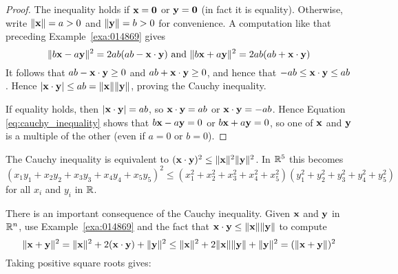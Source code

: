 
\begin{proof}
The inequality holds if $\textbf{x} = \textbf{0}$ or $\textbf{y} = \textbf{0}$ (in fact it is equality). Otherwise, write $\|\textbf{x}\| = a > 0$ and $\|\textbf{y}\| = b > 0$ for convenience. A computation like that preceding Example~\ref{exa:014869} gives
\begin{equation}
\label{eq:cauchy_inequality}
\| b\textbf{x} - a\textbf{y} \|^2 = 2ab(ab - \textbf{x} \cdot \textbf{y}) \mbox{ and } \| b\textbf{x} + a\textbf{y} \|^2 = 2ab(ab + \textbf{x} \cdot \textbf{y})
\end{equation}
It follows that $ab - \textbf{x} \cdot \textbf{y} \geq 0$ and $ab + \textbf{x} \cdot \textbf{y} \geq 0$, and hence that $-ab \leq \textbf{x} \cdot \textbf{y} \leq ab$. Hence $|\textbf{x} \cdot \textbf{y}| \leq ab = \|\textbf{x}\|\|\textbf{y}\|$, proving the Cauchy inequality.

If equality holds, then $|\textbf{x} \cdot \textbf{y}| = ab$, so $\textbf{x} \cdot \textbf{y} = ab$ or $\textbf{x} \cdot \textbf{y} = -ab$. Hence Equation \ref{eq:cauchy_inequality} shows that $b\textbf{x} - a\textbf{y} = 0$ or $b\textbf{x} + a\textbf{y} = 0$, so one of $\textbf{x}$ and $\textbf{y}$ is a multiple of the other (even if $a = 0$ or $b = 0$).
\end{proof}

The Cauchy inequality is equivalent to $(\textbf{x} \cdot \textbf{y})^{2} \leq \|\textbf{x}\|^{2}\|\textbf{y}\|^{2}$. In $\mathbb{R}^5$ this becomes
\begin{equation*}
(x_1y_1 + x_2y_2 + x_3y_3 + x_4y_4 + x_5y_5)^2
\leq (x_1^2 + x_2^2 + x_3^2 + x_4^2 + x_5^2)(y_1^2 + y_2^2 + y_3^2 + y_4^2 + y_5^2)
\end{equation*}
for all $x_{i}$ and $y_{i}$ in $\mathbb{R}$.

There is an important consequence of the Cauchy inequality. Given $\textbf{x}$ and $\textbf{y}$ in $\mathbb{R}^n$, use Example~\ref{exa:014869} and the fact that $\textbf{x} \cdot \textbf{y} \leq \|\textbf{x}\|\|\textbf{y}\|$ to compute
\begin{equation*}
\|\textbf{x} + \textbf{y}\|^2 = \|\textbf{x}\|^2 + 2(\textbf{x} \cdot \textbf{y}) + \|\textbf{y}\|^2 
\leq \|\textbf{x}\|^2 + 2\|\textbf{x}\| \|\textbf{y}\| + \|\textbf{y}\|^2 =
(\|\textbf{x} + \textbf{y}\|)^2
\end{equation*}
Taking positive square roots gives:

